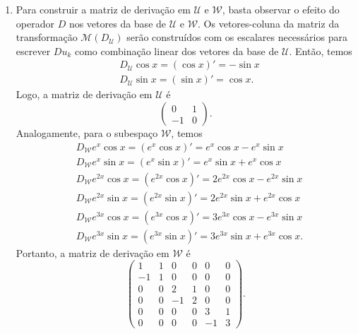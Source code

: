 \documentclass[12pt]{article}
\begin{document}
\begin{enumerate}
    \item[\textbf{E12}] Para construir a matriz de derivação em \(\mathcal{U}\) e \(\mathcal{W}\), basta observar o efeito do operador \(D\) nos vetores da base de \(\mathcal{U}\) e \(\mathcal{W}\). 
    Os vetores-coluna da matriz da transformação \(\mathcal{M}(D_\mathcal{U})\) serão construídos com os escalares necessários para escrever \(Du_k\) como combinação linear dos vetores da base de \(\mathcal{U}\).
    Então, temos
    \begin{align*}
        &D_\mathcal{U}\cos x = (\cos x)' = -\sin x\\
        &D_\mathcal{U}\sin x = (\sin x)' = \cos x.
    \end{align*}
    \noindent Logo, a matriz de derivação em \(\mathcal{U}\) é \[
        \begin{pmatrix}
            0 & 1\\
            -1 & 0
        \end{pmatrix}.
        \]
    Analogamente, para o subespaço \(\mathcal{W}\), temos
    \begin{align*}
        &D_\mathcal{W} e^x \cos x = (e^x \cos x)' = e^x \cos x - e^x \sin x\\
        &D_\mathcal{W} e^x \sin x = (e^x \sin x)' = e^x \sin x + e^x \cos x\\
        &D_\mathcal{W} e^{2x} \cos x = (e^{2x} \cos x)' = 2e^{2x} \cos x - e^{2x} \sin x\\
        &D_\mathcal{W} e^{2x} \sin x = (e^{2x} \sin x)' = 2e^{2x} \sin x + e^{2x} \cos x\\
        &D_\mathcal{W} e^{3x} \cos x = (e^{3x} \cos x)' = 3e^{3x} \cos x - e^{3x} \sin x\\
        &D_\mathcal{W} e^{3x} \sin x = (e^{3x} \sin x)' = 3e^{3x} \sin x + e^{3x} \cos x.
    \end{align*}
    \noindent Portanto, a matriz de derivação em \(\mathcal{W}\) é \[
        \begin{pmatrix}
            1 & 1 & 0 & 0 & 0 & 0\\
            -1 & 1 & 0 & 0 & 0 & 0\\
            0 & 0 & 2 & 1 & 0 & 0\\
            0 & 0 & -1 & 2 & 0 & 0\\
            0 & 0 & 0 & 0 & 3 & 1\\
            0 & 0 & 0 & 0 & -1 & 3
        \end{pmatrix}.
        \]
     
\end{enumerate}
\end{document}
